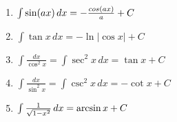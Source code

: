 \documentclass{article}
\begin{document}
\begin{multicols}{3}
\begin{center}
\begin{enumerate}
        \item \begin{math}
            \int \sin({ax}) \, dx = {-{cos(ax) \over a}} + C
        \end{math}
        \item \begin{math}
            \int \tan{x} \, dx = -\ln{\left| \cos {x} \right|} + C
        \end{math}
        \item \begin{math}
            \int \frac{dx}{\cos^2 x}=\int \sec^2 x \, dx = \tan x + C
        \end{math}
        \item \begin{math}
            \int \frac{dx}{\sin^2 x}=\int \csc^2 x \, dx = -\cot x + C
        \end{math}
        \item \begin{math}
            \int {1 \over \sqrt{1-x^2}} \, dx = \arcsin {x} + C
        \end{math}
    \end{enumerate}
\end{center}
\smallskip
\end{multicols}
\end{document}
